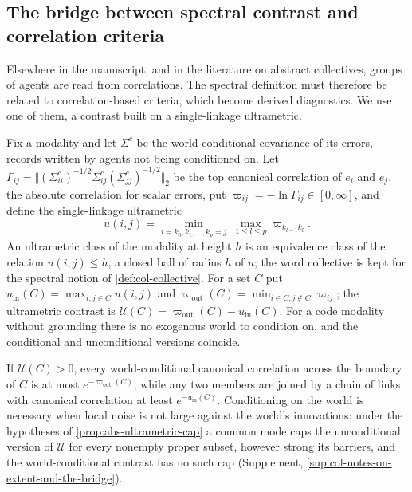 \subsection{The bridge between spectral contrast and correlation criteria}\label{sec:col-bridge}

Elsewhere in the manuscript, and in the literature on abstract collectives, groups of agents are read from correlations. The spectral definition must therefore be related to correlation-based criteria, which become derived diagnostics. We use one of them, a contrast built on a single-linkage ultrametric.

\begin{definition}\label{def:col-ultrametric}
Fix a modality and let $\Sigma^c$ be the world-conditional covariance of its errors, records written by agents not being conditioned on. Let $\Gamma_{ij}=\Vert(\Sigma^c_{ii})^{-1/2}\Sigma^c_{ij}(\Sigma^c_{jj})^{-1/2}\Vert_2$ be the top canonical correlation of $e_i$ and $e_j$, the absolute correlation for scalar errors, put $\varpi_{ij}=-\ln\Gamma_{ij}\in[0,\infty]$, and define the single-linkage ultrametric
\begin{equation}\label{eq:col-ultrametric}
u(i,j)=\min_{i=k_0,k_1,\dots,k_p=j}\ \max_{1\le l\le p}\varpi_{k_{l-1}k_l}.
\end{equation}
An ultrametric class of the modality at height $h$ is an equivalence class of the relation $u(i,j)\le h$, a closed ball of radius $h$ of $u$; the word collective is kept for the spectral notion of \cref{def:col-collective}. For a set $C$ put $u_{\mathrm{in}}(C)=\max_{i,j\in C}u(i,j)$ and $\varpi_{\mathrm{out}}(C)=\min_{i\in C,j\notin C}\varpi_{ij}$; the ultrametric contrast is $\mathcal U(C)=\varpi_{\mathrm{out}}(C)-u_{\mathrm{in}}(C)$. For a code modality without grounding there is no exogenous world to condition on, and the conditional and unconditional versions coincide.
\end{definition}

If $\mathcal U(C)>0$, every world-conditional canonical correlation across the boundary of $C$ is at most $e^{-\varpi_{\mathrm{out}}(C)}$, while any two members are joined by a chain of links with canonical correlation at least $e^{-u_{\mathrm{in}}(C)}$. Conditioning on the world is necessary when local noise is not large against the world's innovations: under the hypotheses of \cref{prop:abs-ultrametric-cap} a common mode caps the unconditional version of $\mathcal U$ for every nonempty proper subset, however strong its barriers, and the world-conditional contrast has no such cap (Supplement, \cref{sup:col-notes-on-extent-and-the-bridge}).

